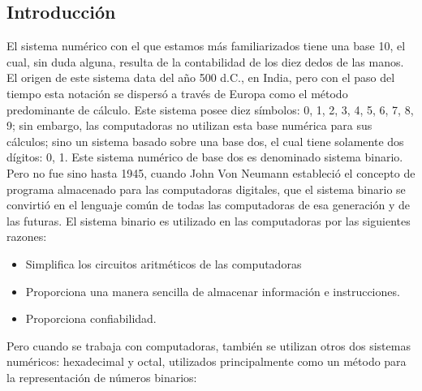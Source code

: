 \documentclass[12pt]{article}
\begin{document}
		\begin{center}
			\section*{Introducción}\label{sec:Introducción}
		\end{center}
			El sistema numérico con el que estamos más familiarizados tiene una base 10, el cual, sin duda 
			alguna, resulta de la contabilidad de los diez dedos de las manos. El origen de este sistema data del 
			año 500 d.C., en India, pero con el paso del tiempo esta notación se dispersó a través de Europa 
			como el método predominante de cálculo. Este sistema posee diez símbolos: 0, 1, 2, 3, 4, 5, 6, 7, 8, 9; 
			sin embargo, las computadoras no utilizan esta base numérica para sus cálculos; sino un sistema 
			basado sobre una base dos, el cual tiene solamente dos dígitos: 0, 1. Este sistema numérico de base 
			dos es denominado sistema binario. Pero no fue sino hasta 1945, cuando John Von Neumann 
			estableció el concepto de programa almacenado para las computadoras digitales, que el sistema 
			binario se convirtió en el lenguaje común de todas las computadoras de esa generación y de las 
			futuras.
			El sistema binario es utilizado en las computadoras por las siguientes razones:
			\begin{itemize}
				\item Simplifica los circuitos aritméticos de las computadoras
				\item Proporciona una manera sencilla de almacenar información e instrucciones.
				\item Proporciona confiabilidad.
			\end{itemize}
			Pero cuando se trabaja con computadoras, también se utilizan otros dos sistemas numéricos: 
			hexadecimal y octal, utilizados principalmente como un método para la representación 
			de números binarios:
\end{document}
